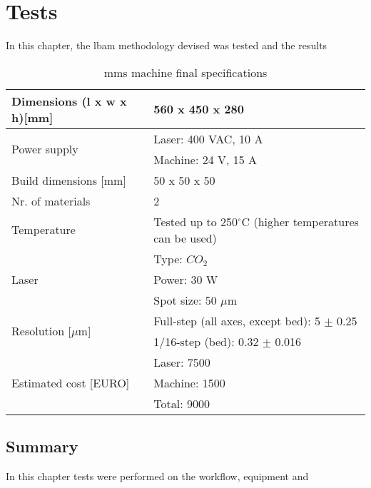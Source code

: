 \chapter{Tests}
\label{ch:application}
In this chapter, the \gls{lbam} methodology devised was tested and the results

\begin{table}[!hbt]
\centering
\caption{\gls{mms} machine final specifications}
\label{tab:mach-final-specs}
\begin{tabular}{ll}
\hline
Dimensions (l x w x h){[}mm{]} & 560 x 450 x 280 \\ \hline
\multirow{2}{*}{Power supply} & Laser: 400 VAC, 10 A \\ \cline{2-2} 
 & Machine: 24 V, 15 A \\ \hline
Build dimensions {[}mm{]} & 50 x 50 x 50 \\ \hline
Nr. of materials & 2 \\ \hline
Temperature & Tested up to 250$^{\circ}$C (higher temperatures can be used) \\ \hline
\multirow{3}{*}{Laser} & Type: $CO_2$ \\ \cline{2-2} 
 & Power: 30 W \\ \cline{2-2} 
 & Spot size: 50 $\mu$m \\ \hline
  \multirow{2}{*}{Resolution {[}$\mu$m{]}} & Full-step (all axes, except bed): 5 $\pm$ 0.25 \\ \cline{2-2} 
 & 1/16-step (bed): 0.32 $\pm$ 0.016 \\ \hline
\multirow{3}{*}{Estimated cost {[}EURO{]}} & Laser: 7500 \\ \cline{2-2} 
 & Machine: 1500 \\ \cline{2-2} 
 & Total: 9000 \\ \hline
\end{tabular}
\end{table}

\section{Summary}
In this chapter tests were performed on the workflow, equipment and
